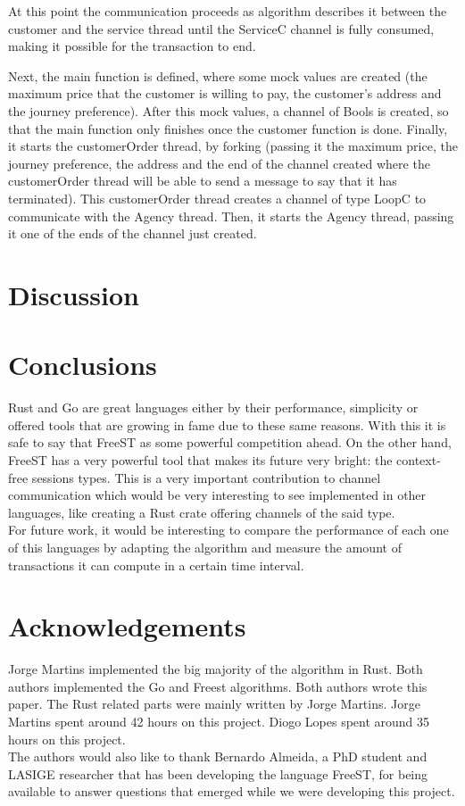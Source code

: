 \documentclass[runningheads]{llncs}
\begin{document}
At this point the communication proceeds as algorithm describes it between the customer and the service thread until the ServiceC channel is fully consumed, making it possible for the transaction to end.

Next, the main function is defined, where some mock values are created (the maximum price that the customer is willing to pay, the customer's address and the journey preference). After this mock values, a channel of Bools is created, so that the main function only finishes once the customer function is done. Finally, it starts the customerOrder thread, by forking (passing it the maximum price, the journey preference, the address and the end of the channel created where the customerOrder thread will be able to send a message to say that it has terminated). This customerOrder thread creates a channel of type LoopC to communicate with the Agency thread. Then, it starts the Agency thread, passing it one of the ends of the channel just created.
\section{Discussion}
\section{Conclusions}
Rust and Go are great languages either by their performance, simplicity or offered tools that are growing in fame due to these same reasons. With this it is safe to say that FreeST as some powerful competition ahead. On the other hand, FreeST has a very powerful tool that makes its future very bright: the context-free sessions types.
This is a very important contribution to channel communication which would be very interesting to see implemented in other languages, like creating a Rust crate offering channels of the said type.
\\For future work, it would be interesting to compare the performance of each one of this languages by adapting the algorithm and measure the amount of transactions it can compute in a certain time interval.
\section*{Acknowledgements}
Jorge Martins implemented the big majority of the algorithm in Rust. Both authors implemented the Go and Freest algorithms.
Both authors wrote this paper. The Rust related parts were mainly written by Jorge Martins.
Jorge Martins spent around 42 hours on this project. Diogo Lopes spent around 35 hours on this project.\\
The authors would also like to thank Bernardo Almeida, a PhD student and LASIGE researcher that has been developing the language FreeST, for being available to answer questions that emerged while we were developing this project.


\end{document}

